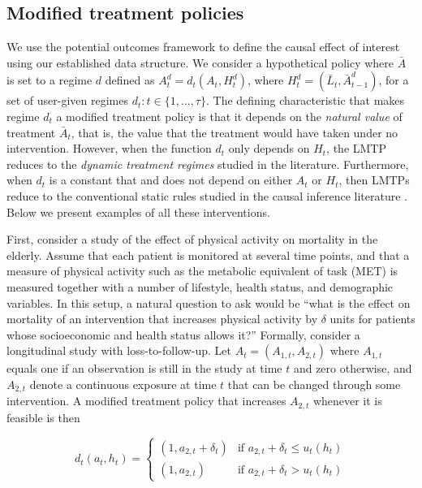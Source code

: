\documentclass[]{jss}
\begin{document}
\hypertarget{modified-treatment-policies}{%
\subsection{Modified treatment
policies}\label{modified-treatment-policies}}

We use the potential outcomes framework to define the causal effect of
interest using our established data structure. We consider a
hypothetical policy where \(\bar{A}\) is set to a regime \(d\) defined
as \(A^{d}_t = d_t(A_t, H^{d}_t)\), where
\(H^{d}_t = (\bar{L}_t, \bar{A}^{d}_{t - 1})\), for a set of
user-given regimes \(d_t:t \in \{1, ..., \tau\}\). The defining
characteristic that makes regime \(d_t\) a modified treatment policy
is that it depends on the \emph{natural value} of treatment
\(\bar{A}_t\), that is, the value that the treatment would have taken
under no intervention. However, when the function $d_t$ only depends
on $H_t$, the LMTP reduces to the \textit{dynamic treatment regimes}
studied in the literature. Furthermore, when $d_t$ is a constant that
and does not depend on either $A_t$ or $H_t$, then LMTPs reduce to the
conventional static rules studied in the causal inference literature
\citep[e.g.,][]{bang2005doubly, van2011targeted}. Below we present
examples of all these interventions.

First, consider a study of the effect of physical activity on
mortality in the elderly. Assume that each patient is monitored at
several time points, and that a measure of physical activity such as
the metabolic equivalent of task (MET) \citep{mendes2018metabolic} is
measured together with a number of lifestyle, health status, and
demographic variables. In this setup, a natural question to ask would
be ``what is the effect on mortality of an intervention that increases
physical activity by $\delta$ units for patients whose socioeconomic
and health status allows it?'' Formally, consider a longitudinal study
with loss-to-follow-up. Let \(A_t = (A_{1, t}, A_{2, t})\) where
\(A_{1, t}\) equals one if an observation is still in the study at
time \(t\) and zero otherwise, and \(A_{2, t}\) denote a continuous
exposure at time \(t\) that can be changed through some
intervention. A modified treatment policy that increases \(A_{2,t}\)
whenever it is feasible is then

\begin{equation}\label{eq:mtp}
d_t(a_t,h_t)=
\begin{cases}
  (1, a_{2,t} + \delta_t) & \text{if } a_{2,t} + \delta_t \leq u_t(h_t)  \\
  (1, a_{2,t}) & \text{if } a_{2,t} + \delta_t > u_t(h_t)
\end{cases}
\end{equation}
\end{document}
